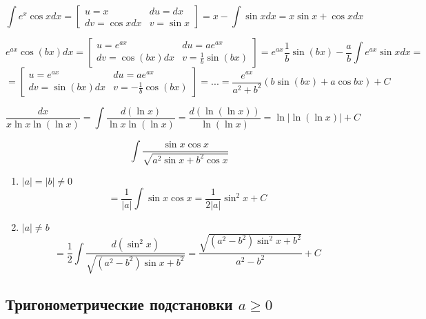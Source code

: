 \documentclass[main]{subfiles}
\begin{document}
    \begin{Example}
        \[\int e^x \cos x dx = \left[\begin{matrix}
            u = x & du = dx\\
            dv = \cos x dx & v = \sin x
        \end{matrix}\right] = x - \int \sin x dx =x \sin x + \cos x dx\]
    \end{Example}

    \begin{Example}
        \[e^{ax} \cos (bx) dx = \left[\begin{matrix}
            u = e^{ax} & du = a e^{ax}\\
            dv = \cos (bx) dx & v = \frac{1}{b} \sin (bx)
        \end{matrix}\right] = e^{ax} \frac{1}{b} \sin (bx) - \frac{a}{b} \int e^{ax} \sin x dx =\]
        \[= \left[\begin{matrix}
            u = e^{ax} & du = a e^{ax}\\
            dv = \sin (bx) dx & v = -\frac{1}{b} \cos (bx)
        \end{matrix}\right] = ... = \frac{e^{ax}}{a^2 + b^2} (b\sin(bx) + a\cos{bx}) + C\]
    \end{Example}

    \begin{Example}
        \[\frac{dx}{x \ln x \ln (\ln x)} = \int \frac{d(\ln x)}{\ln x \ln(\ln x)} = \frac{d(\ln(\ln x))}{\ln(\ln x)} = \ln|\ln(\ln x)| + C\]
    \end{Example}

    \begin{Example}
        \[\int \frac{\sin x \cos x}{\sqrt{a^2 \sin x + b^2 \cos x}}\]
        \begin{enumerate}
          \item $|a| = |b| \neq 0$
          \[= \frac{1}{|a|} \int \sin x \cos x = \frac{1}{2|a|} \sin^2 x + C\]
          \item $|a| \neq b$
          \[= \frac{1}{2} \int \frac{d(\sin^2 x)}{\sqrt{(a^2 - b^2) \sin x + b^2}} = \frac{\sqrt{(a^2 - b^2) \sin^2 x + b^2}}{a^2 - b^2} + C\]
        \end{enumerate}
    \end{Example}

    \newpage
    \subsection{Тригонометрические подстановки $a \geq 0$}
\end{document}
